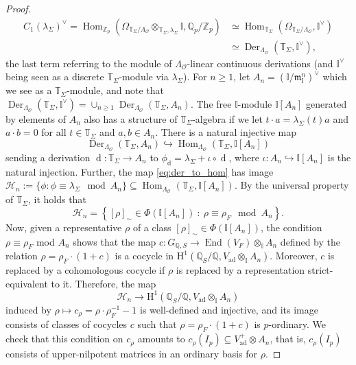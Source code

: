 \documentclass[12pt]{amsart}
\newcommand\bI{\mathbb{I}}
\newcommand\bQ{\mathbb{Q}}
\newcommand\bT{\mathbb{T}}
\newcommand\Zp{{\mathbb{Z}_p}}
\newcommand\Qp{{\mathbb{Q}_p}}
\newcommand\cH{\mathcal{H}}
\newcommand\cO{\mathcal{O}}
\newcommand\gm{\mathfrak{m}}
\DeclareMathOperator{\Der}{Der}
\DeclareMathOperator{\Hom}{Hom}
\DeclareMathOperator{\ad}{ad}
\DeclareMathOperator{\End}{End}
\DeclareMathOperator{\diff}{d}
\newcommand{\HH}{\mathrm{H}}
\theoremstyle{defstyle}
\theoremstyle{thmstyle}
\begin{document}
\begin{proof}
\begin{align*}
	C_1(\lambda_\Sigma)^\vee=\Hom_{\Zp}(\Omega_{\bT_\Sigma/\Lambda_\cO}\otimes_{\bT_\Sigma,\lambda_\Sigma} \bI,\Qp/\Zp)
	&\simeq\Hom_{\bT_\Sigma}(\Omega_{\bT_\Sigma/\Lambda_\cO},\bI^\vee) \\
	&\simeq\Der_{\Lambda_\cO}(\bT_\Sigma,\bI^\vee),
\end{align*}
the last term referring to the module of $\Lambda_\cO$-linear continuous derivations (and $\bI^\vee$ being seen as a discrete $\bT_\Sigma$-module via $\lambda_\Sigma$). For $n\geq 1$, let $A_n=(\bI/\gm_\bI^n)^\vee$ which we see as a $\bT_\Sigma$-module, and note that $\Der_{\Lambda_\cO}(\bT_\Sigma,\bI^\vee)=\cup_{n\geq 1}\Der_{\Lambda_\cO}(\bT_\Sigma,A_n)$. The free $\bI$-module $\bI[A_n]$ generated by elements of $A_n$ also has a structure of $\bT_\Sigma$-algebra if we let $t\cdot a=\lambda_\Sigma(t)a$ and $a\cdot b=0$ for all $t\in\bT_\Sigma$ and $a,b\in A_n$. There is a natural injective map 
\begin{equation}\label{eq:der_to_hom}
	\Der_{\Lambda_\cO}(\bT_\Sigma,A_n) \hookrightarrow \Hom_{\Lambda_\cO}(\bT_\Sigma,\bI[A_n])
\end{equation}
sending a derivation $\diff\colon \bT_\Sigma \to A_n$ to $\phi_{\diff}=\lambda_\Sigma+\iota\circ \diff$, where $\iota\colon A_n \hookrightarrow\bI[A_n]$ is the natural injection. Further, the map \eqref{eq:der_to_hom} has image $\cH_n:=\{\phi\colon \phi\equiv \lambda_\Sigma \mod A_n\}\subseteq \Hom_{\Lambda_\cO}(\bT_\Sigma,\bI[A_n])$. By the universal property of $\bT_\Sigma$, it holds that
\[\cH_n=\left\{[\rho]_\sim\in\Phi(\bI[A_n]) \ : \ \rho\equiv\rho_F \mod A_n\right\}.\]
Now, given a representative $\rho$ of a class $[\rho]_\sim\in\Phi(\bI[A_n])$, the condition $\rho\equiv \rho_F$ mod $A_n$ shows that the map $c\colon G_{\bQ,S} \to \End(V_F)\otimes_{\bI} A_n$ defined by the relation $\rho=\rho_F\cdot(1+c)$ is a cocycle in $\HH^1(\bQ_S/\bQ,V_{\ad}\otimes_{\bI}A_n)$. Moreover, $c$ is replaced by a cohomologous cocycle if $\rho$ is replaced by a representation strict-equivalent to it. Therefore, the map
\[\cH_n \to \HH^1(\bQ_S/\bQ,V_{\ad}\otimes_{\bI}A_n)\]
induced by $\rho \mapsto c_\rho=\rho\cdot\rho_F^{-1}-1$ is well-defined and injective, and its image consists of classes of cocycles $c$ such that $\rho=\rho_F\cdot(1+c)$ is $p$-ordinary. We check that this condition on $c_\rho$ amounts to $c_\rho(I_p)\subseteq V_{\ad}^+\otimes A_n$, that is, $c_\rho(I_p)$ consists of upper-nilpotent matrices in an ordinary basis for $\rho$.


\end{proof}
\end{document}
